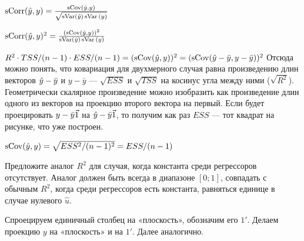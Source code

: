 \begin{problem}






\begin{sol}
$\operatorname{sCorr}(\hat{y}, y)=\frac{\operatorname{sCov}(\hat{y}, y)}{\sqrt{\operatorname{sVar}(\hat{y})\operatorname{sVar}{(y)}}}$

$\operatorname{sCorr}(\hat{y}, y)^2=\frac{(\operatorname{sCov}(\hat{y}, y))^2}{\operatorname{sVar}(\hat{y})\operatorname{sVar}{(y)}} $

$R^2\cdot TSS/(n-1)\cdot ESS/(n-1)=(\operatorname{sCov}(\hat{y}, y))^2=(\operatorname{sCov}(\hat{y}-\bar y, y-\bar y))^2$
Отсюда можно понять, что ковариация для двухмерного случая равна произведению длин векторов $\hat{y}-\bar y$ и $y-\bar y$ — $\sqrt{ESS}$ и $\sqrt{TSS}$ на косинус угла между ними ($\sqrt{R^2}$). 
Геометрически скалярное произведение можно изобразить как произведение длин одного из векторов на проекцию второго вектора на первый. 
Если будет проецировать $y-\bar y\vec{1}$ на $\hat{y}-\bar y\vec{1}$, то получим как раз $ESS$ — тот квадрат на рисунке, что уже построен.


$\operatorname{sCov}(\hat{y}, y)=\sqrt{ESS^2/(n-1)^2}=ESS/(n-1)$


\end{sol}
\end{problem}


\begin{problem}
Предложите аналог $R^2$ для случая, когда константа среди регрессоров отсутствует. 
Аналог должен быть всегда в диапазоне $[0;1]$, совпадать с обычным $R^2$, когда среди регрессоров есть константа, равняться единице в случае нулевого $\hat{u}$.


\begin{sol}
Спроецируем единичный столбец на «плоскость», обозначим его $1'$. Делаем проекцию $y$ на «плоскость» и на $1'$. Далее аналогично.
\end{sol}
\end{problem}



